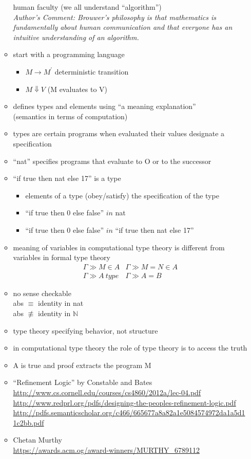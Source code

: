 \documentclass{article}
\begin{document}
\begin{enumerate}
\begin{itemize}
human faculty (we all understand ``algorithm'')\\
{\sl Author's Comment: Brouwer's philosophy is that mathematics is
fundamentally about human communication and that everyone has an
intuitive understanding of an algorithm.}
\item start with a programming language
\begin{itemize}
\item $M\rightarrow M^\prime$ deterministic transition
\item $M\Downarrow V$ (M evaluates to V)
\end{itemize}
\item defines types and elements using ``a meaning explanation''\\
(semantics in terms of computation)
\item types are certain programs when evaluated their values
designate a specification
\item ``nat'' specifies programs that evaluate to O or to the successor
\item ``if true then nat else 17'' is a type
\begin{itemize}
\item elements of a type (obey/satisfy) the specification of the type
\item ``if true then 0 else false'' $in$ nat
\item ``if true then 0 else false'' $in$ ``if true then nat else 17''
\end{itemize}
\item meaning of variables in computational type theory is different
from variables in formal type theory
\[\begin{array}{cl}
\Gamma \gg M\in A & \Gamma \gg M=N \in A\\
\Gamma \gg A~type & \Gamma \gg A=B
\end{array}\]
\item no sense checkable\\
abs $\equiv$ identity in nat\\
abs $\not\equiv$ identity in $\mathbb{N}$
\item type theory specifying behavior, not structure
\item in computational type theory the role of type theory is to access the
truth
\item A is true and proof extracts the program M
\item ``Refinement Logic'' by Constable and Bates\\
\href{url}{http://www.cs.cornell.edu/courses/cs4860/2012a/lec-04.pdf}\\
\href{url}{http://www.redprl.org/pdfs/designing-the-peoples-refinement-logic.pdf}\\
\href{url}{http://pdfs.semanticscholar.org/c466/665677a8a82a1e5084574972da1a5d11c2bb.pdf}
\item Chetan Murthy\\
\href{url}{https://awards.acm.og/award-winners/MURTHY\_6789112}
\end{itemize}
\end{enumerate}
\end{document}
